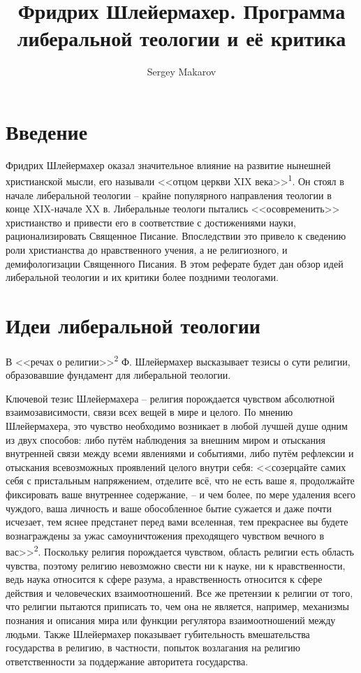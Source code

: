 \documentclass[11pt]{article}
\author{Sergey Makarov}
\date{}
\title{Фридрих Шлейермахер. Программа либеральной теологии и её критика}
\begin{document}
\maketitle
\section{Введение}
\label{sec:org3453b82}
Фридрих Шлейермахер оказал значительное влияние на развитие нынешней христианской мысли, его
называли {}<<отцом церкви XIX века>>{}\textsuperscript{1}. Он стоял в начале либеральной теологии -- крайне популярного
направления теологии в конце XIX-начале XX в. Либеральные теологи пытались {}<<осовременить>>{}
христианство и привести его в соответствие с достижениями науки, рационализировать Священное
Писание. Впоследствии это привело к сведению роли христианства до нравственного учения, а не
религиозного, и демифологизации Священного Писания. В этом реферате будет дан обзор идей
либеральной теологии и их критики более поздними теологами.
\section{Идеи либеральной теологии}
\label{sec:org2b52dbf}
В {}<<речах о религии>>{}\textsuperscript{2} Ф. Шлейермахер высказывает тезисы о сути религии, образовавшие фундамент для либеральной теологии.

Ключевой тезис Шлейермахера -- религия порождается чувством абсолютной взаимозависимости, связи всех вещей в мире и целого.
По мнению Шлейермахера, это чувство необходимо возникает в любой лучшей душе одним из двух способов: либо путём наблюдения за
внешним миром и отыскания внутренней связи между всеми явлениями и событиями, либо путём рефлексии и отыскания всевозможных
проявлений целого внутри себя: {}<<созерцайте самих себя с пристальным напряжением, отделите всё, что не есть ваше я, продолжайте
фиксировать ваше внутреннее содержание, -- и чем более, по мере удаления всего чуждого, ваша личность и ваше обособленное бытие
сужается и даже почти исчезает, тем яснее предстанет перед вами вселенная, тем прекраснее вы будете вознаграждены за ужас
самоуничтожения преходящего чувством вечного в вас>>{}\textsuperscript{2}. Поскольку религия порождается чувством, область религии есть область
чувства, поэтому религию невозможно свести ни к науке, ни к нравственности, ведь наука относится к сфере разума, а нравственность
относится к сфере действия и человеческих взаимоотношений. Все же претензии к религии от того, что религии пытаются приписать то,
чем она не является, например, механизмы познания и описания мира или функции регулятора взаимоотношений между людьми. Также
Шлейермахер показывает губительность вмешательства государства в религию, в частности, попыток возлагания на религию
ответственности за поддержание авторитета государства.
\end{document}
